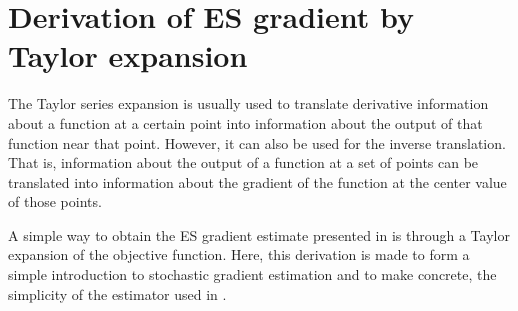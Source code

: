 
\section{Derivation of ES gradient by Taylor expansion}\label{sec: Theory: stochastic gradient by Taylor expoansion}
The Taylor series expansion is usually used to translate derivative information about a function at a certain point into information about the output of that function near that point. However, it can also be used for the inverse translation. That is, information about the output of a function at a set of points can be translated into information about the gradient of the function at the center value of those points. 

A simple way to obtain the \gls{ES} gradient estimate presented in \cite{Salimans2017} is through a Taylor expansion of the objective function. Here, this derivation is made to form a simple introduction to stochastic gradient estimation and to make concrete, the simplicity of the estimator used in \cite{Salimans2017}.

